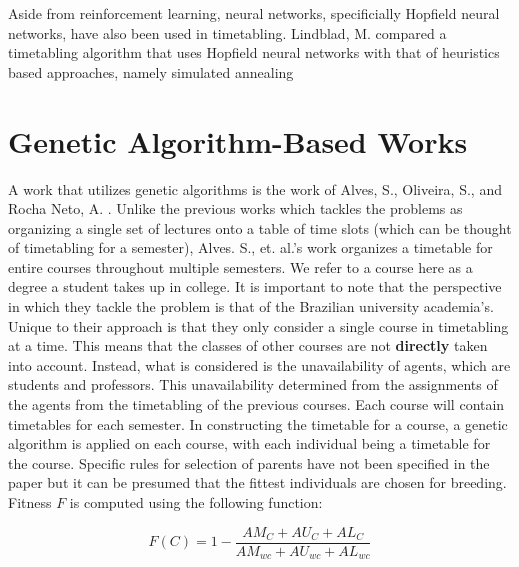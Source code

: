 Aside from reinforcement learning, neural networks, specificially Hopfield neural networks, have also been used in timetabling. Lindblad, M. compared a timetabling algorithm that uses Hopfield neural networks with that of heuristics based approaches, namely simulated annealing 

\section{Genetic Algorithm-Based Works}
A work that utilizes genetic algorithms is the work of Alves, S., Oliveira, S., and Rocha Neto, A. \cite{alves-novel-recursive}. Unlike the previous works which tackles the problems as organizing a single set of lectures onto a table of time slots (which can be thought of timetabling for a semester), Alves. S., et. al.'s work organizes a timetable for entire courses throughout multiple semesters. We refer to a course here as a degree a student takes up in college. It is important to note that the perspective in which they tackle the problem is that of the Brazilian university academia's. Unique to their approach is that they only consider a single course in timetabling at a time. This means that the classes of other courses are not \textbf{directly} taken into account. Instead, what is considered is the unavailability of agents, which are students and professors. This unavailability determined from the assignments of the agents from the timetabling of the previous courses. Each course will contain timetables for each semester. In constructing the timetable for a course, a genetic algorithm is applied on each course, with each individual being a timetable for the course. Specific rules for selection of parents have not been specified in the paper but it can be presumed that the fittest individuals are chosen for breeding. Fitness $F$ is computed using the following function:

\[
	F(C) = 1 - \frac{AM_{C} + AU_{C} + AL_{C}}{AM_{wc} + AU_{wc} + AL_{wc}}
\]

